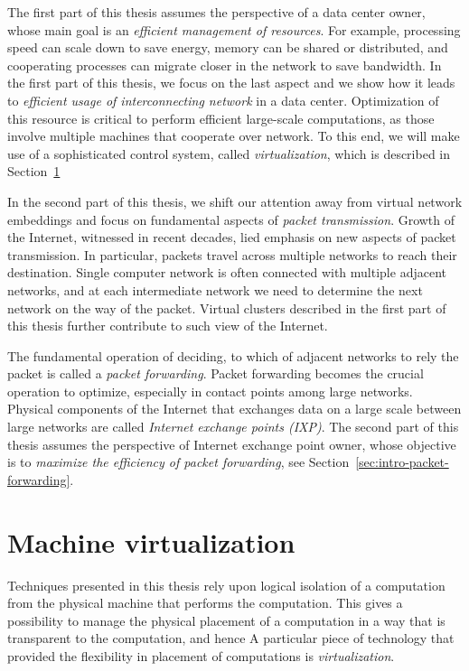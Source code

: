 The first part of this thesis assumes the perspective of a data center owner, whose main goal is an \emph{efficient management of resources}.
For example, processing speed can scale down to save energy, memory can be shared or distributed, and cooperating processes can migrate closer in the network to save bandwidth.
In the first part of this thesis, we focus on the last aspect and we show how it leads to
\emph{efficient usage of interconnecting network} in a data center.
Optimization of this resource is critical to perform efficient large-scale computations, as those involve multiple machines that cooperate over network.
To this end, we will make use of a sophisticated control system, called \emph{virtualization}, which is described in Section~\ref{sec:intro-machine-virtualization}


In the second part of this thesis, we shift our attention away from virtual network embeddings and focus on fundamental aspects of \emph{packet transmission}.
Growth of the Internet, witnessed in recent decades, lied emphasis on new aspects of packet transmission.
In particular, packets travel across multiple networks to reach their destination.
Single computer network is often connected with multiple adjacent networks, and at each intermediate network we need to determine the next network on the way of the packet.
Virtual clusters described in the first part of this thesis further contribute to such view of the Internet.

The fundamental operation of deciding, to which of adjacent networks to rely the packet is called a \emph{packet forwarding}.
Packet forwarding becomes the crucial operation to optimize, especially in contact points among large networks.
Physical components of the Internet that exchanges data on a large scale between large networks are called \emph{Internet exchange points (IXP)}.
The second part of this thesis assumes the perspective of Internet exchange point owner, whose objective is to \emph{maximize the efficiency of packet forwarding}, see Section~\ref{sec:intro-packet-forwarding}.

\section{Machine virtualization}
\label{sec:intro-machine-virtualization}

Techniques presented in this thesis rely upon logical isolation of a computation from the physical machine that performs the computation.
This gives a possibility to manage the physical placement of a computation in a way that is transparent to the computation, and hence 
A particular piece of technology that provided the flexibility in placement of computations is \emph{virtualization}.

